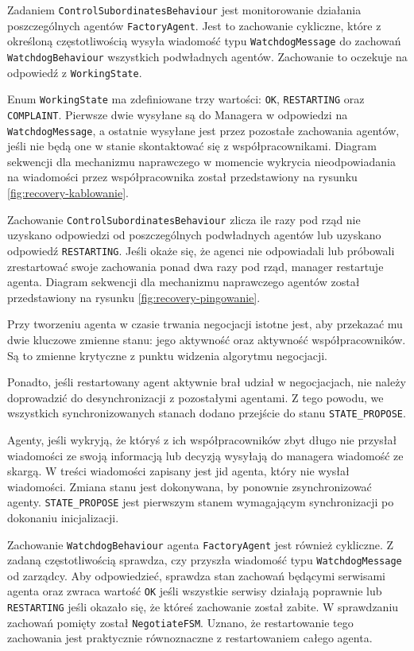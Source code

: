 Zadaniem \texttt{ControlSubordinatesBehaviour} jest monitorowanie działania poszczególnych agentów \texttt{FactoryAgent}. Jest to zachowanie cykliczne, które z określoną częstotliwością wysyła wiadomość typu \texttt{WatchdogMessage} do zachowań \texttt{WatchdogBehaviour} wszystkich podwładnych agentów. Zachowanie to oczekuje na odpowiedź z \texttt{WorkingState}. 

Enum \texttt{WorkingState} ma zdefiniowane trzy wartości: \texttt{OK}, \texttt{RESTARTING} oraz \texttt{COMPLAINT}. Pierwsze dwie wysyłane są do Managera w odpowiedzi na \texttt{WatchdogMessage}, a ostatnie wysyłane jest przez pozostałe zachowania agentów, jeśli nie będą one w stanie skontaktować się z współpracownikami. Diagram sekwencji dla mechanizmu naprawczego w momencie wykrycia nieodpowiadania na wiadomości przez współpracownika został przedstawiony na rysunku \ref{fig:recovery-kablowanie}.

Zachowanie \texttt{ControlSubordinatesBehaviour} zlicza ile razy pod rząd nie uzyskano odpowiedzi od poszczególnych podwładnych agentów lub uzyskano odpowiedź \texttt{RESTARTING}. Jeśli okaże się, że agenci nie odpowiadali lub próbowali zrestartować swoje zachowania ponad dwa razy pod rząd, manager restartuje agenta. Diagram sekwencji dla mechanizmu naprawczego agentów został przedstawiony na rysunku \ref{fig:recovery-pingowanie}.

Przy tworzeniu agenta w czasie trwania negocjacji istotne jest, aby przekazać mu dwie kluczowe zmienne stanu: jego aktywność oraz aktywność współpracowników. Są to zmienne krytyczne z punktu widzenia algorytmu negocjacji. 

Ponadto, jeśli restartowany agent aktywnie brał udział w negocjacjach, nie należy doprowadzić do desynchronizacji z pozostałymi agentami. Z tego powodu, we wszystkich synchronizowanych stanach dodano przejście do stanu \texttt{STATE\_PROPOSE}. 

Agenty, jeśli wykryją, że któryś z ich współpracowników zbyt długo nie przysłał wiadomości ze swoją informacją lub decyzją wysyłają do managera wiadomość ze skargą. W treści wiadomości zapisany jest jid agenta, który nie wysłał wiadomości. Zmiana stanu jest dokonywana, by ponownie zsynchronizować agenty. \texttt{STATE\_PROPOSE} jest pierwszym stanem wymagającym synchronizacji po dokonaniu inicjalizacji.

Zachowanie \texttt{WatchdogBehaviour} agenta \texttt{FactoryAgent} jest również cykliczne. Z zadaną częstotliwością sprawdza, czy przyszła wiadomość typu \texttt{WatchdogMessage} od zarządcy. Aby odpowiedzieć, sprawdza stan zachowań będącymi serwisami agenta oraz zwraca wartość \texttt{OK} jeśli wszystkie serwisy działają poprawnie lub \texttt{RESTARTING} jeśli okazało się, że któreś zachowanie został zabite. W sprawdzaniu zachowań pomięty został \texttt{NegotiateFSM}. Uznano, że restartowanie tego zachowania jest praktycznie równoznaczne z restartowaniem całego agenta. 

